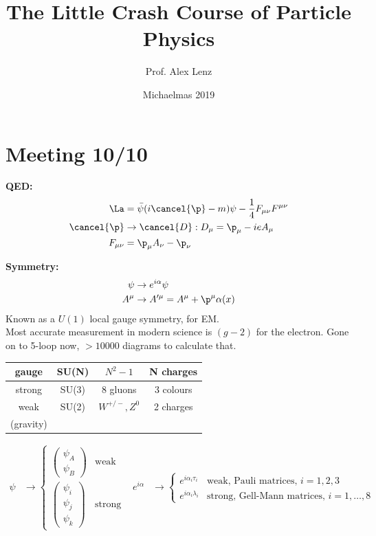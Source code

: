 \documentclass[a4paper, 11pt, normalem]{article}
\title{The Little Crash Course of Particle Physics \vspace{-20pt}}
\author{Prof. Alex Lenz}
\date{\vspace{-15pt}Michaelmas 2019}
\begin{document}
\maketitle

\section*{Meeting 10/10}
\textbf{\large QED:}
\begin{align}
    \La &= \bar{\psi}(i\cancel{\p}-m)\psi - \frac14F_{\mu\nu}F^{\mu\nu} \\
    \cancel{\p} &\to \cancel{D}: D_\mu = \p_\mu - ieA_\mu \\
    F_{\mu\nu} &= \p_\mu A_\nu - \p_\nu
\end{align}

\textbf{\large Symmetry:}
\begin{align}
    \psi &\to e^{i\alpha}\psi \\
    A^\mu &\to A'^\mu = A^\mu + \p^\mu\alpha(x)
\end{align}
Known as a $U(1)$ local gauge symmetry, for EM. \\
Most accurate measurement in modern science is $(g-2)$ for the electron. 
Gone on to 5-loop now, $>10000$ diagrams to calculate that. 
\begin{table}[H]
    \centering
    \begin{tabular}{c|c|c|c}
        gauge & SU(N) & $N^2-1$ & N charges \\
        \hline
        strong & SU(3) & 8 gluons & 3 colours \\
        weak & SU(2) & $W^{+/-},Z^0$ & 2 charges \\
        (gravity) & & &
    \end{tabular}
\end{table}
\begin{align}
    \psi &\to \begin{cases} \begin{pmatrix} \psi_A \\ \psi_B \end{pmatrix} & \text{weak} \\ \begin{pmatrix} \psi_i \\ \psi_j \\ \psi_k \end{pmatrix} & \text{strong} \end{cases} & e^{i\alpha} &\to \begin{cases} e^{i\alpha_i\tau_i} & \text{weak, Pauli matrices, }i=1,2,3 \\ e^{i\alpha_i\lambda_i} & \text{strong, Gell-Mann matrices, }i=1,\dots,8 \end{cases}
\end{align}
\end{document}
